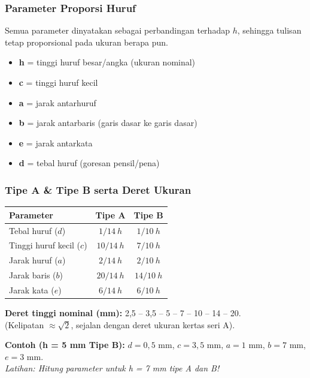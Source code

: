 \documentclass[../gbr_teknik.tex]{subfiles}
\begin{document}
\begin{frame}[mytitle=imageplus]
	\frametitle{Parameter Proporsi Huruf}

	Semua parameter dinyatakan sebagai perbandingan terhadap $h$, sehingga tulisan tetap proporsional pada ukuran berapa pun.

	\vspace{1em}
	\begin{itemize}
		\item \textbf{h} = tinggi huruf besar/angka (ukuran nominal)
		\item \textbf{c} = tinggi huruf kecil
		\item \textbf{a} = jarak antarhuruf
		\item \textbf{b} = jarak antarbaris (garis dasar ke garis dasar)
		\item \textbf{e} = jarak antarkata
		\item \textbf{d} = tebal huruf (goresan pensil/pena)
	\end{itemize}
\end{frame}

\begin{frame}[mytitle=standard]
	\frametitle{Tipe A \& Tipe B serta Deret Ukuran}

	\begin{table}[h]
		\centering
		\begin{tabular}{lcc}
			\toprule
			\textbf{Parameter}       & \textbf{Tipe A} & \textbf{Tipe B} \\
			\midrule
			Tebal huruf ($d$)        & $1/14~h$        & $1/10~h$        \\
			Tinggi huruf kecil ($c$) & $10/14~h$       & $7/10~h$        \\
			Jarak huruf ($a$)        & $2/14~h$        & $2/10~h$        \\
			Jarak baris ($b$)        & $20/14~h$       & $14/10~h$       \\
			Jarak kata ($e$)         & $6/14~h$        & $6/10~h$        \\
			\bottomrule
		\end{tabular}
	\end{table}

	\textbf{Deret tinggi nominal (mm):} 2,5 -- 3,5 -- 5 -- 7 -- 10 -- 14 -- 20. \\
	(Kelipatan $\approx \sqrt{2}$, sejalan dengan deret ukuran kertas seri A).

	\vspace{0.5em}
	\textbf{Contoh (h = 5 mm Tipe B):} $d = 0,5$ mm, $c = 3,5$ mm, $a = 1$ mm, $b = 7$ mm, $e = 3$ mm. \\
	\textit{Latihan: Hitung parameter untuk h = 7 mm tipe A dan B!}
\end{frame}
\end{document}

